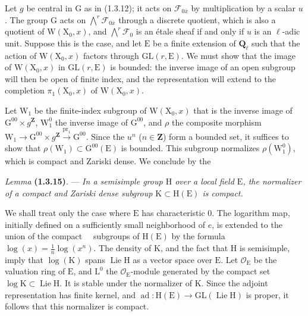 \documentclass[11pt,leqno]{article}
\newcommand{\Page}[1]{\ifvmode\noindent\else\unskip\ \fi{\footnotesize\textcolor{gray}{[p.\,#1]}}\ \ignorespaces}
\begin{document}
Let \(g\) be central in \(\mathrm{G}\) as in (1.3.12); it acts on \(\mathcal{F}_{0\bar{x}}\) by multiplication by a scalar \(u\). The group \(\mathrm{G}\) acts on \(\bigwedge\limits^r\mathcal{F}_{0\bar{x}}\) through a discrete quotient, which is also a quotient of \(\mathrm{W}(\mathrm{X}_0,x)\), and \(\bigwedge\limits^r\mathcal{F}_0\) is an étale sheaf if and only if \(u\) is an \(\ell\)-adic unit. Suppose this is the case, and let \(\mathrm{E}\) be a finite extension of \(\mathbf{Q}_\ell\) such that the action of \(\mathrm{W}(\mathrm{X}_0,x)\) factors through \(\mathrm{GL}(r,\mathrm{E})\). We must show that the image of \(\mathrm{W}(\mathrm{X}_0,x)\) in \(\mathrm{GL}(r,\mathrm{E})\) is bounded: the inverse image of an open subgroup will then be open of finite index, and the representation will extend to the completion \(\pi_1(\mathrm{X}_0,x)\) of \(\mathrm{W}(\mathrm{X}_0,x)\).

Let \(\mathrm{W}_1\) be the finite-index subgroup of \(\mathrm{W}(\mathrm{X}_0,x)\) that is the inverse image of \(\mathrm{G}^{00}\times g^{\mathbf{Z}}\), \(\mathrm{W}_1^0\) the inverse image of \(\mathrm{G}^{00}\), and \(\rho\) the composite morphism \(\mathrm{W}_1\to\mathrm{G}^{00}\times g^{\mathbf{Z}}\xrightarrow{\mathrm{pr}_1}\mathrm{G}^{00}\). Since the \(u^n\) (\(n\in\mathbf{Z}\)) form a bounded set, it suffices to show that \(\rho(\mathrm{W}_1)\subset\mathrm{G}^{00}(\mathrm{E})\) is bounded. This subgroup normalizes \(\rho(\mathrm{W}_1^0)\), which is compact and Zariski dense. We conclude by the

\textit{Lemma} \textbf{(1.3.15)}. — \textit{In a semisimple group \(\mathrm{H}\) over a local field \(\mathrm{E}\), the normalizer of a compact and Zariski dense subgroup \(\mathrm{K}\subset\mathrm{H}(\mathrm{E})\) is compact.}

We shall treat only the case where \(\mathrm{E}\) has characteristic \(0\). The logarithm map, initially defined on a sufficiently small neighborhood of \(e\), is extended to the union of the compact \Page{162}subgroups of \(\mathrm{H}(\mathrm{E})\) by the formula \(\log(x)=\frac{1}{n}\log(x^n)\). The density of \(\mathrm{K}\), and the fact that \(\mathrm{H}\) is semisimple, imply that \(\log(\mathrm{K})\) spans \(\operatorname{Lie}\mathrm{H}\) as a vector space over \(\mathrm{E}\). Let \(\mathcal{O}_{\mathrm{E}}\) be the valuation ring of \(\mathrm{E}\), and \(\mathrm{L}^0\) the \(\mathcal{O}_{\mathrm{E}}\)-module generated by the compact set \(\log\mathrm{K}\subset\operatorname{Lie}\mathrm{H}\). It is stable under the normalizer of \(\mathrm{K}\). Since the adjoint representation has finite kernel, and \(\operatorname{ad}:\mathrm{H}(\mathrm{E})\to\mathrm{GL}(\operatorname{Lie}\mathrm{H})\) is proper, it follows that this normalizer is compact.
\end{document}
